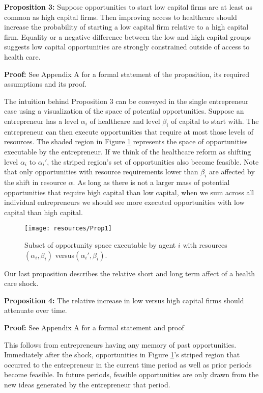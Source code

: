 \documentclass[12pt]{article}
\begin{document}
\textbf{Proposition 3:} 
Suppose opportunities to start low capital firms are at least as common as high capital firms. Then improving access to healthcare should increase the probability of starting a low capital firm relative to a high capital firm. Equality or a negative difference between the low and high capital groups suggests low capital opportunities are strongly constrained outside of access to health care. 

\textbf{Proof:}
See Appendix A for a formal statement of the proposition, its required assumptions and its proof. 

The intuition behind Proposition 3 can be conveyed in the single entrepreneur case using a visualization of the space of potential opportunities. Suppose an entrepreneur has a level $\alpha_i$ of healthcare and level $\beta_i$ of capital to start with. The entrepreneur can then execute opportunities that require at most those levels of resources. The shaded region in Figure \ref{fig:ideaSpace} represents the space of opportunities executable by the entrepreneur. If we think of the healthcare reform as shifting level $\alpha_i$ to $\alpha_i'$, the striped region's set of opportunities also become feasible. Note that only opportunities with resource requirements lower than $\beta_i$ are affected by the shift in resource $\alpha$. As long as there is not a larger mass of potential opportunities that require high capital than low capital, when we sum across all individual entrepreneurs we should see more executed opportunities with low capital than high capital. 

\begin{figure}[H]
	\centering
	\texttt{[image: resources/Prop1]}
	\caption{Subset of opportunity space executable by agent $i$ with resources $(\alpha_i,\beta_i)$ versus$(\alpha_i', \beta_i)$.}
	\label{fig:ideaSpace}
\end{figure}

Our last proposition describes the relative short and long term affect of a health care shock. 

\textbf{Proposition 4:} The relative increase in low versus high capital firms should attenuate over time. 

\textbf{Proof:} See Appendix A for a formal statement and proof

This follows from entrepreneurs having any memory of past opportunities. Immediately after the shock, opportunities in Figure \ref{fig:ideaSpace}'s striped region that occurred to the entrepreneur in the current time period as well as prior periods become feasible. In future periods, feasible opportunities are only drawn from the new ideas generated by the entrepreneur that period.
\end{document}
